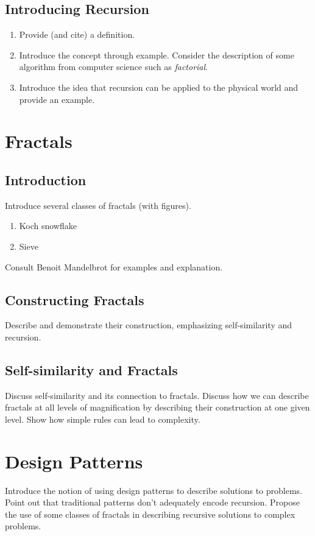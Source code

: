 \documentclass[jou,apacite]{apa6}
\begin{document}
\subsection{Introducing Recursion}  %
\begin{enumerate}
  \item Provide (and cite) a definition.
  \item Introduce the concept through example.  Consider the description of some algorithm from computer science such as \emph{factorial}.
  \item Introduce the idea that recursion can be applied to the physical world and provide an example.
\end{enumerate}

\section{Fractals}  %
\subsection{Introduction}
Introduce several classes of fractals (with figures).
\begin{enumerate}
  \item Koch snowflake
  \item Sieve 
\end{enumerate}
Consult Benoit Mandelbrot for examples and explanation.

\subsection{Constructing Fractals}
Describe and demonstrate their construction, emphasizing self-similarity and recursion.

\subsection{Self-similarity and Fractals}
Discuss self-similarity and its connection to fractals.  Discuss how we can describe fractals at all levels of magnification by describing their construction at one given level.  Show how simple rules can lead to complexity.

\section{Design Patterns}  %
Introduce the notion of using design patterns to describe solutions to problems.  Point out that traditional patterns don't adequately encode recursion.  Propose the use of some classes of fractals in describing recursive solutions to complex problems.
\end{document}
